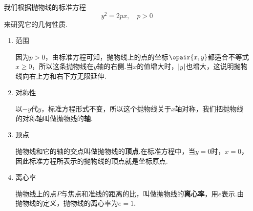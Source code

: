 我们根据抛物线的标准方程\[
y^2 = 2px, \quad p > 0
\]来研究它的几何性质.
\begin{enumerate}
\item 范围

因为\(p>0\)，由标准方程可知，抛物线上的点的坐标\(\opair{x,y}\)都适合不等式\(x \geqslant 0\)，所以这条抛物线在\(y\)轴的右侧.当\(x\)的值增大时，\(\abs{y}\)也增大，这说明抛物线向右上方和右下方无限延伸.

\item 对称性

以\(-y\)代\(y\)，标准方程形式不变，所以这个抛物线关于\(x\)轴对称，我们把抛物线的对称轴叫做抛物线的\textbf{轴}.

\item 顶点

抛物线和它的轴的交点叫做抛物线的\textbf{顶点}.在标准方程中，当\(y=0\)时，\(x=0\)，因此标准方程所表示的抛物线的顶点就是坐标原点.

\item 离心率

抛物线上的点\(P\)与焦点和准线的距离的比，叫做抛物线的\textbf{离心率}，用\(e\)表示.由抛物线的定义，抛物线的离心率为\(e = 1\).
\end{enumerate}

